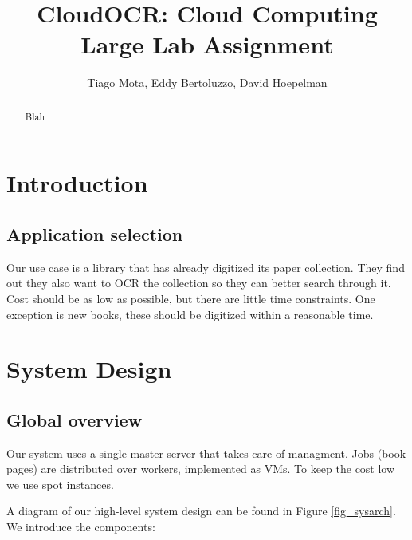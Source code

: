 \documentclass[a4paper]{IEEEtran}
\title{CloudOCR: Cloud Computing Large Lab Assignment}
\author{Tiago Mota, Eddy Bertoluzzo, David Hoepelman}
\begin{document}
\maketitle

\begin{abstract}

Blah
\end{abstract}

\section{Introduction}

\subsection{Application selection}

Our use case is a library that has already digitized its paper collection. They find out they also want to OCR the collection so they can better search through it. Cost should be as low as possible, but there are little time constraints. One exception is new books, these should be digitized within a reasonable time. 

\section{System Design}

\subsection*{Global overview}

Our system uses a single master server that takes care of managment. Jobs (book pages) are distributed over workers, implemented as VMs. To keep the cost low we use spot instances.

A diagram of our high-level system design can be found in Figure \ref{fig_sysarch}.
We introduce the components:
\end{document}
